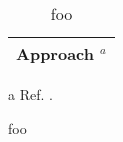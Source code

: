 \documentclass{book}
\begin{document}
\begin{table}[htbp]
\centering
\caption{foo}
\begin{threeparttable}
\begin{tabular}{l}
\hline
Approach $^a$\\
\hline
\end{tabular}
\begin{tablenotes}
\footnotesize
\item[a] Ref. \cite{foo}.
\end{tablenotes}
\end{threeparttable}
\end{table}

\begin{thebibliography}{1}
foo

\end{thebibliography}
\end{document}
